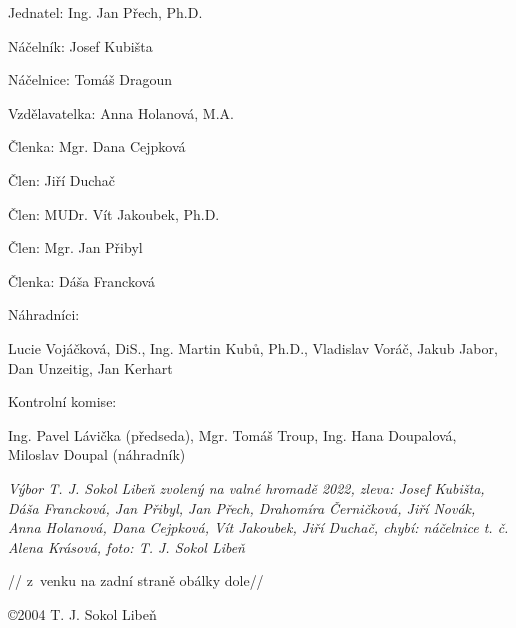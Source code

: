 \documentclass[a5paper, 12pt, twoside]{article}
\begin{document}
Jednatel: Ing. Jan Přech, Ph.D.

Náčelník: Josef Kubišta

Náčelnice: Tomáš Dragoun

Vzdělavatelka: Anna Holanová, M.A.

Členka: Mgr. Dana Cejpková

Člen: Jiří Duchač

Člen: MUDr. Vít Jakoubek, Ph.D.

Člen: Mgr. Jan Přibyl

Členka: Dáša Francková

Náhradníci:

Lucie Vojáčková, DiS., Ing. Martin Kubů, Ph.D., Vladislav Voráč, Jakub
Jabor, Dan Unzeitig, Jan Kerhart

Kontrolní komise:

Ing. Pavel Lávička (předseda), Mgr. Tomáš Troup, Ing. Hana Doupalová,
Miloslav Doupal (náhradník)


\textit{Výbor T. J. Sokol Libeň zvolený na valné hromadě 2022, zleva:
Josef Kubišta, Dáša Francková, Jan Přibyl, Jan Přech, Drahomíra
Černičková, Jiří Novák, Anna Holanová, Dana Cejpková, Vít Jakoubek, Jiří
Duchač, chybí: náčelnice t. č. Alena Krásová, foto: T. J. Sokol Libeň}

// z~venku na zadní straně obálky dole//

\clearpage
{}
\vspace*{96pt}

\copyright 2004 T. J. Sokol Libeň


\pagecolor{sokolred}
\color{white}
\end{document}
